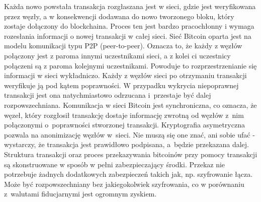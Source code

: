 \documentclass[12pt, twoside, final, openany]{mgr}
\begin{document}
\indent Każda nowo powstała transakcja rozgłaszana jest w sieci, gdzie jest weryfikowana przez węzły, a w konsekwencji dodawana do nowo tworzonego bloku, który zostaje dołączony do blockchaina. Proces ten jest bardzo pracochłonny i wymaga rozesłania informacji o nowej transakcji w całej sieci. Sieć Bitcoin oparta jest na modelu komunikacji typu P2P (peer-to-peer). Oznacza to, że każdy z węzłów połączony jest z paroma innymi uczestnikami sieci, a z kolei ci uczestnicy połączeni są z paroma kolejnymi uczestnikami. Powoduje to rozprzestrzenianie się informacji w sieci wykładniczo. Każdy z węzłów sieci po otrzymaniu transakcji weryfikuje ją pod kątem poprawności. W przypadku wykrycia niepoprawnej transakcji jest ona natychmiastowo odrzucana i~przestaje być dalej rozpowszechniana. Komunikacja w sieci Bitcoin jest synchroniczna, co oznacza, że węzeł, który rozgłosił transakcję dostaje informację zwrotną od węzłów z~nim połączonymi o~poprawności stworzonej transakcji. Kryptografia asymetryczna pozwala na anonimizację węzłów w~sieci. Nie muszą się one znać, ani sobie ufać - wystarczy, że transakcja jest prawidłowo podpisana, a~będzie przekazana dalej. Struktura transakcji oraz proces przekazywania bitcoinów przy pomocy transakcji są skonstruowane w sposób w pełni zabezpieczający środki. Przekaz nie potrzebuje żadnych dodatkowych zabezpieczeń takich jak, np. szyfrowanie łącza. Może być rozpowszechniany bez jakiegokolwiek szyfrowania, co w porównaniu z~walutami fiducjarnymi jest ogromnym zyskiem\cite{Mastering}.
\end{document}
